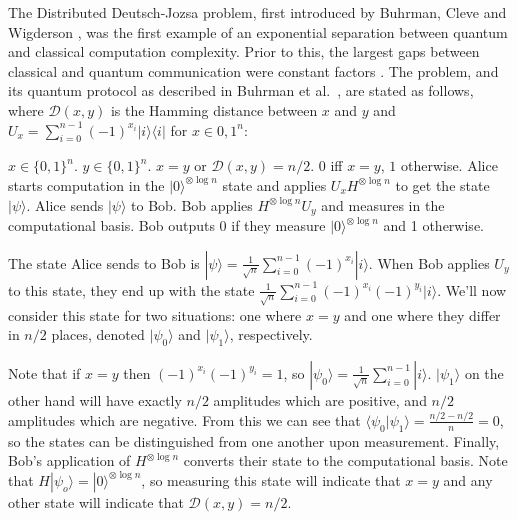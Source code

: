 \documentclass[a4paper]{article}
\begin{document}
        The Distributed Deutsch-Jozsa problem, first introduced by Buhrman, Cleve and Wigderson \cite{Buhrman:1998:QVC:276698.276713}, was the first example of an exponential separation between quantum and classical computation complexity. Prior to this, the largest gaps between classical and quantum communication were constant factors \cite{quant-ph/9704026}. The problem, and its quantum protocol as described in Buhrman et al.~\cite{RevModPhys.82.665}, are stated as follows, where $\mathcal{D}(x, y)$ is the Hamming distance between $x$ and $y$ and $U_x = \sum_{i=0}^{n-1}(-1)^{x_i}|i\rangle\langle i|$ for $x \in {0, 1}^n$:

        \begin{codebox}
            \zi {} $x \in \{0, 1\}^n$.
            \zi {} $y \in \{0, 1\}^n$.
            \zi {} $x = y$ or $\mathcal{D}(x, y) = n/2$.
            \zi {} $0$ iff $x = y$, $1$ otherwise.
            \li Alice starts computation in the $|0\rangle^{\otimes \log n}$ state and applies $U_xH^{\otimes \log n}$ to get the state $|\psi\rangle$.
            \li Alice sends $|\psi\rangle$ to Bob.
            \li Bob applies $H^{\otimes \log n}U_y$ and measures in the computational basis.
            \li Bob outputs $0$ if they measure $|0\rangle^{\otimes \log n}$ and 1 otherwise.
            \End
        \end{codebox}

        The state Alice sends to Bob is $|\psi\rangle = \frac{1}{\sqrt{n}}\sum_{i=0}^{n-1} (-1)^{x_i}|i\rangle$. When Bob applies $U_y$ to this state, they end up with the state $\frac{1}{\sqrt{n}}\sum_{i=0}^{n-1}(-1)^{x_i}(-1)^{y_i}|i\rangle$. We'll now consider this state for two situations: one where $x = y$ and one where they differ in $n/2$ places, denoted $|\psi_0\rangle$ and $|\psi_1\rangle$, respectively.

        Note that if $x = y$ then $(-1)^{x_i}(-1)^{y_i} = 1$, so $|\psi_0\rangle = \frac{1}{\sqrt{n}}\sum_{i = 0}^{n-1}|i\rangle$. $|\psi_1\rangle$ on the other hand will have exactly $n/2$ amplitudes which are positive, and $n/2$ amplitudes which are negative. From this we can see that $\langle\psi_0|\psi_1\rangle = \frac{n/2 - n/2}{n} = 0$, so the states can be distinguished from one another upon measurement. Finally, Bob's application of $H^{\otimes \log n}$ converts their state to the computational basis. Note that $H|\psi_o\rangle = |0\rangle^{\otimes\log n}$, so measuring this state will indicate that $x = y$ and any other state will indicate that $\mathcal{D}(x, y) = n/2$.
\end{document}
